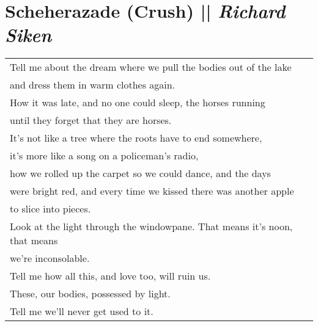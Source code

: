 \section[Scheherazade (Crush)]{Scheherazade (Crush) || \emph{Richard Siken} \hspace*{\fill}  \thepage}
\hspace{0pt}
\vfill
\begin{center}
\begin{tabular}{l}
Tell me about the dream where we pull the bodies out of the lake\\
and dress them in warm clothes again.\\
How it was late, and no one could sleep, the horses running\\
until they forget that they are horses.\\
It’s not like a tree where the roots have to end somewhere,\\
it’s more like a song on a policeman’s radio,\\
how we rolled up the carpet so we could dance, and the days\\
were bright red, and every time we kissed there was another apple\\
to slice into pieces.\\
Look at the light through the windowpane. That means it’s noon, that means\\
we’re inconsolable.\\
Tell me how all this, and love too, will ruin us.\\
These, our bodies, possessed by light.\\
Tell me we’ll never get used to it.
\end{tabular}
\end{center}
\vfill
\hspace{0pt}
